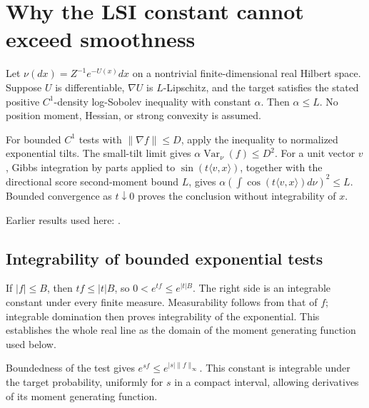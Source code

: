 \documentclass[11pt,a4paper]{report}
\begin{document}
\section{\texorpdfstring{Why the LSI constant cannot exceed smoothness}{Why the LSI constant cannot exceed smoothness}}
\label{proof-module-UnadjustedLangevin-LSI-Compatibility-lean}


Let \(\nu(dx)=Z^{-1}e^{-U(x)}dx\) on a nontrivial finite-dimensional real Hilbert space. Suppose \(U\) is differentiable, \(\nabla U\) is \(L\)-Lipschitz, and the target satisfies the stated positive \(C^1\)-density log-Sobolev inequality with constant \(\alpha\). Then \(\alpha\le L\). No position moment, Hessian, or strong convexity is assumed.



For bounded \(C^1\) tests with \(\|\nabla f\|\le D\), apply the inequality to normalized exponential tilts. The small-tilt limit gives \(\alpha\operatorname{Var}_\nu(f)\le D^2\). For a unit vector \(v\), Gibbs integration by parts applied to \(\sin(t\langle v,x\rangle)\), together with the directional score second-moment bound \(L\), gives \(\alpha(\int\cos(t\langle v,x\rangle)d\nu)^2\le L\). Bounded convergence as \(t\downarrow0\) proves the conclusion without integrability of \(x\).



Earlier results used here: \cite[Section~3.27]{LangevinLean2026ULASC}.
\subsection{\texorpdfstring{Integrability of bounded exponential tests}{Integrability of bounded exponential tests}}
\label{report-step-UnadjustedLangevin-LSI-Compatibility-lean-1}


If \(|f|\le B\), then \(tf\le |t|B\), so \(0<e^{tf}\le e^{|t|B}\). The right side is an integrable constant under every finite measure. Measurability follows from that of \(f\); integrable domination then proves integrability of the exponential. This establishes the whole real line as the domain of the moment generating function used below.



Boundedness of the test gives \(e^{sf}\le e^{|s|\|f\|_\infty}\). This constant is integrable under the target probability, uniformly for \(s\) in a compact interval, allowing derivatives of its moment generating function.
\end{document}
